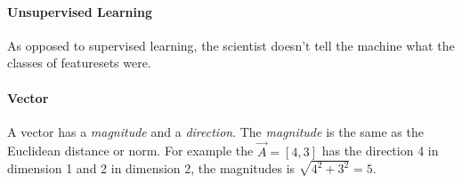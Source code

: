 \paragraph{Unsupervised Learning}
As opposed to supervised learning, the scientist doesn't tell the machine what the classes of featuresets were.

\paragraph{Vector}
A vector has a \emph{magnitude} and a \emph{direction}. The \emph{magnitude} is the same as the Euclidean distance or norm. For example the $\vec{A} = [4, 3]$ has the direction 4 in dimension 1 and 2 in dimension 2, the magnitudes is $\sqrt{4^2 + 3^2} = 5$. 


 

